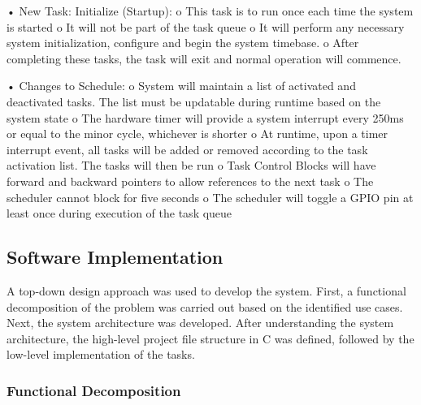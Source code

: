 \documentclass[12pt]{article} %
\begin{document}
\begin{itemize}
•	New Task: Initialize (Startup):
o	This task is to run once each time the system is started
o	It will not be part of the task queue
o	It will perform any necessary system initialization, configure and begin the system timebase.
o	After completing these tasks, the task will exit and normal operation will commence.

•	Changes to Schedule:
o	System will maintain a list of activated and deactivated tasks. The list must be updatable during runtime based on the system state
o	The hardware timer will provide a system interrupt every 250ms or equal to the minor cycle, whichever is shorter
o	At runtime, upon a timer interrupt event, all tasks will be added or removed according to the task activation list. The tasks will then be run
o	Task Control Blocks will have forward and backward pointers to allow references to the next task
o	The scheduler cannot block for five seconds
o	The scheduler will toggle a GPIO pin at least once during execution of the task queue	
\end{itemize}

\subsection{Software Implementation}

A top-down design approach was used to develop the system.  First, a functional decomposition of the problem was carried out based on the identified use cases.  Next, the system architecture was developed.  After understanding the system architecture, the high-level project file structure in C was defined, followed by the low-level implementation of the tasks.

\subsubsection{Functional Decomposition}

\end{document}
